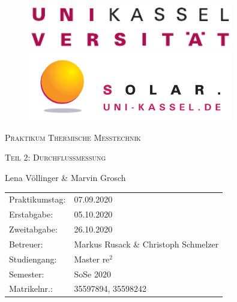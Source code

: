 \documentclass[10pt,a4paper,toc=listof,toc=bibliography]{scrartcl}
\begin{document}
	\begin{titlepage}
		
		\begin{figure}[H]
			\begin{minipage}{0.5\textwidth}
				\centering
				\includegraphics[width=0.8\textwidth]{../DATA/Logo_Uni-Kassel.pdf}
			\end{minipage}\hfill
			\begin{minipage}{0.5\textwidth}
				\centering
				\includegraphics[width=0.8\textwidth]{../DATA/Logo_solar.png}
			\end{minipage}
		\end{figure}
		
		\vspace{3cm}
		
		\centering
		{\scshape\LARGE Praktikum Thermische Messtechnik \par}   %
		\vspace{1cm}
		{\scshape\Large Teil 2: Durchflussmessung \par}
		\vspace{1.5cm}
		\vspace{2cm}
		{\Large Lena Völlinger \& Marvin Grosch\par}
		\vfill
		
		\begin{large}
			\begin{tabular}{l l}
				
				Praktikumstag: & 07.09.2020 \\
				Erstabgabe: & 05.10.2020\\
				Zweitabgabe: & 26.10.2020\\
				Betreuer: & Markus Rusack \& Christoph Schmelzer\\
				Studiengang: & Master $\text{re}^2$\\
				Semester: & SoSe 2020\\
				Matrikelnr.: & 35597894, 35598242\\ 
			\end{tabular}
		\end{large}
		
	\end{titlepage}
	
\end{document}
